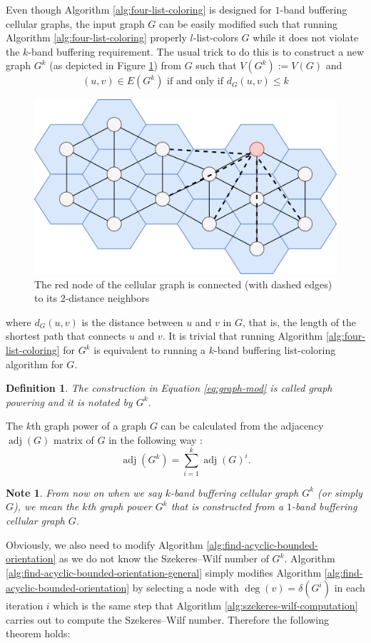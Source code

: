 \documentclass[a4paper, 12pt]{article}
\newtheorem{defin}[lem]{Definition}
\newtheorem{note}[lem]{Note}
\newcommand{\adj}{\mathop{\mathrm{adj}}}
\begin{document}
Even though Algorithm \ref{alg:four-list-coloring} is designed for $1$-band buffering cellular graphs, the input graph $G$ can be easily modified such that running Algorithm \ref{alg:four-list-coloring} properly $l$-list-colors $G$ while it does not violate the $k$-band buffering requirement. The usual trick to do this is to construct a new graph $G^k$ (as depicted in Figure \ref{fig:cellular-graph-extension}) from $G$ such that $V(G^k) := V(G)$ and
\begin{equation}\label{eq:graph-mod}
(u,v) \in E(G^k) \text{ if and only if } d_{G}(u,v) \leqslant k
\end{equation}
\begin{figure}[!h]
\centering
\includegraphics[scale=0.09]{figures/cellular_graph_extension.png}
\caption{The red node of the cellular graph is connected (with dashed edges) to its $2$-distance neighbors}\label{fig:cellular-graph-extension}
\end{figure}
where $d_{G}(u,v)$ is the distance between $u$ and $v$ in $G$, that is, the length of the shortest path that connects $u$ and $v$. It is trivial that running Algorithm \ref{alg:four-list-coloring} for $G^k$ is equivalent to running a $k$-band buffering list-coloring algorithm  for $G$.

\begin{defin} The construction in Equation \ref{eq:graph-mod} is called graph powering and it is notated by $G^k$. 
\end{defin}

The $k$th graph power of a graph $G$ can be calculated from the adjacency $\adj(G)$ matrix of $G$ in the following way \cite{power}:
$$
\adj(G^k) = \sum^k_{i=1} \adj(G)^i.
$$
\begin{note} From now on when we say $k$-band buffering cellular graph $G^k$ (or simply $G$), we mean the $k$th graph power $G^k$ that is constructed from a $1$-band buffering cellular graph $G$.
\end{note}
Obviously, we also need to modify Algorithm \ref{alg:find-acyclic-bounded-orientation} as we do not know the Szekeres\---Wilf number of $G^k$. Algorithm \ref{alg:find-acyclic-bounded-orientation-general} simply modifies Algorithm \ref{alg:find-acyclic-bounded-orientation} by selecting a node with $\deg(v) = \delta(G^i)$ in each iteration $i$ which is the same step that Algorithm \ref{alg:szekeres-wilf-computation} carries out to compute the Szekeres\---Wilf number. Therefore the following theorem holds:
\end{document}
